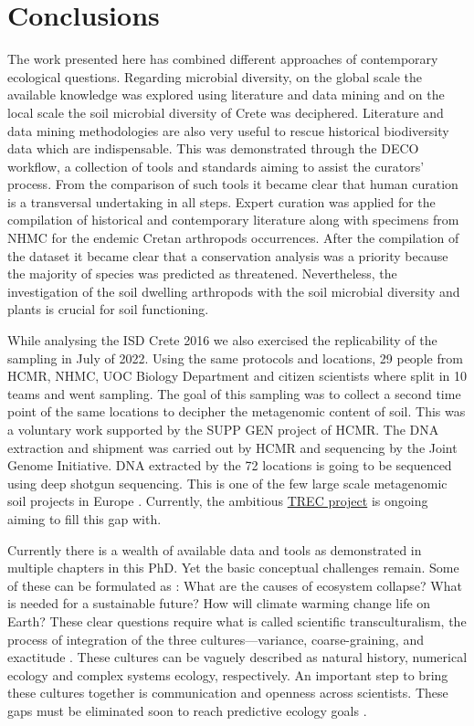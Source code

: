 % 
% 

\chapter{Conclusions}
\label{cha:conclusions}

The work presented here has combined different approaches of contemporary 
ecological questions. Regarding microbial diversity, on the global scale the available 
knowledge was explored using literature and data mining and on the local scale
the soil microbial diversity of Crete was deciphered. Literature and data mining 
methodologies are also very useful to rescue historical biodiversity data which are
indispensable. This was demonstrated through the DECO workflow, a collection
of tools and standards aiming to assist the curators' process. From the comparison
of such tools it became clear that human curation is a transversal undertaking in all steps.
Expert curation was applied for the compilation of historical and contemporary
literature along with specimens from NHMC for the endemic Cretan arthropods occurrences.
After the compilation of the dataset it became clear that a conservation analysis
was a priority because the majority of species was predicted as threatened.
Nevertheless, the investigation of the soil dwelling arthropods with the soil microbial diversity
and plants is crucial for soil functioning. 

While analysing the ISD Crete 2016 we also exercised the replicability of the sampling in July of 2022.
Using the same protocols and locations, 29 people from HCMR, NHMC, UOC Biology
Department and citizen scientists where split in 10 teams and went sampling. 
The goal of this sampling was to collect a second time point of the same locations
to decipher the metagenomic content of soil. This was a voluntary work supported 
by the SUPP GEN project of HCMR. The DNA extraction and shipment was carried out 
by HCMR and sequencing by the Joint Genome Initiative. DNA extracted by the 72 locations 
is going to be sequenced using deep shotgun sequencing. This is one of the few large scale metagenomic soil projects in
Europe \parencite{nayfach2021a-genomic, ma2023a-genomic}. Currently, 
the ambitious \href{https://www.embl.org/about/info/trec/}{TREC project} is
ongoing aiming to fill this gap with.

Currently there is a wealth of available data and tools as demonstrated in 
multiple chapters in this PhD. Yet the basic conceptual challenges remain. 
Some of these can be formulated as : What are the causes of ecosystem collapse?
What is needed for a sustainable future?
How will climate warming change life on Earth?
These clear questions require what is called scientific transculturalism,
the process of integration of the three cultures—variance, coarse-graining, and exactitude \parencite{Enquist_2024}.
These cultures can be vaguely described as natural history, numerical ecology and complex systems ecology, respectively.
An important step to bring these cultures together is communication and openness across scientists.
These gaps must be eliminated soon to reach predictive ecology goals \parencite{mouquet_review_2015}.
